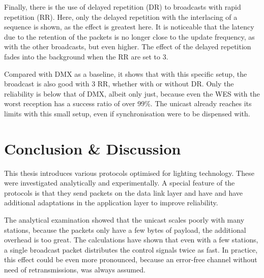 Finally, there is the use of delayed repetition (DR) to broadcasts with rapid repetition (RR).
Here, only the delayed repetition with the interlacing of a sequence is shown,
as the effect is greatest here.
It is noticeable that the latency due to the retention of the packets is no longer close to the update frequency, 
as with the other broadcasts, but even higher.
The effect of the delayed repetition fades into the background when the RR are set to 3.

Compared with DMX as a baseline, it shows that with this specific setup,
the broadcast is also good with 3 RR, whether with or without DR.
Only the reliability is below that of DMX, albeit only just,
because even the WES with the worst reception has a success ratio of over 99\%.
The unicast already reaches its limits with this small setup,
even if synchronisation were to be dispensed with.

\chapter{Conclusion \& Discussion}

This thesis introduces various protocols optimised for lighting technology.
These were investigated analytically and experimentally.
A special feature of the protocols is that they send packets on the data link layer and have
and have additional adaptations in the application layer to improve reliability.

The analytical examination showed that the unicast
scales poorly with many stations,
because the packets only have a few bytes of payload, the additional overhead is too great.
The calculations have shown that even with a few stations, a single broadcast packet
distributes the control signals twice as fast.
In practice, this effect could be even more pronounced,
because an error-free channel without need of retransmissions, was always assumed.

